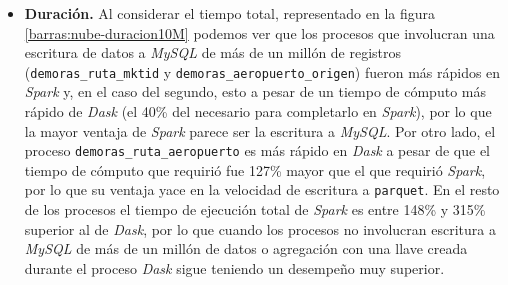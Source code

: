 \begin{itemize}
	\item \textbf{Duración.} Al considerar el tiempo total, representado en la figura \ref{barras:nube-duracion10M} podemos ver que los procesos que involucran una escritura de datos a \textit{MySQL} de más de un millón de registros (\texttt{demoras\_ruta\_mktid} y \texttt{demoras\_aeropuerto\_origen}) fueron más rápidos en \textit{Spark} y, en el caso del segundo, esto a pesar de un tiempo de cómputo más rápido de \textit{Dask} (el 40\% del necesario para completarlo en \textit{Spark}), por lo que la mayor ventaja de \textit{Spark} parece ser la escritura a \textit{MySQL}. Por otro lado, el proceso \texttt{demoras\_ruta\_aeropuerto} es más rápido en \textit{Dask} a pesar de que el tiempo de cómputo que requirió fue 127\% mayor que el que requirió \textit{Spark}, por lo que su ventaja yace en la velocidad de escritura a \texttt{parquet}. En el resto de los procesos el tiempo de ejecución total de \textit{Spark} es entre 148\% y 315\% superior al de \textit{Dask}, por lo que cuando los procesos no involucran escritura a \textit{MySQL} de más de un millón de datos o agregación con una llave creada durante el proceso \textit{Dask} sigue teniendo un desempeño muy superior.
	
\end{itemize}

